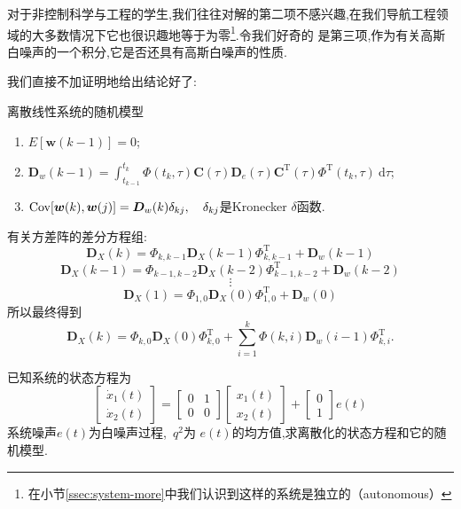 \documentclass[cn,10pt,citestyle=gb7714-2015,bibstyle=gb7714-2015]{elegantbook}
\newcommand{\md}{\ \mathrm{d}}
\newcommand{\mT}{\mathrm{T}}
\newcommand{\Cov}{\textup{Cov}}
\begin{document}
对于非控制科学与工程的学生,我们往往对解的第二项不感兴趣,在我们导航工程领域的大多数情况下它也很识趣地等于为零\footnote{在小节\ref{ssec:system-more}中我们认识到这样的系统是独立的（autonomous）}.令我们好奇的
是第三项,作为有关高斯白噪声的一个积分,它是否还具有高斯白噪声的性质.

我们直接不加证明地给出结论好了:
\begin{conclusion}离散线性系统的随机模型
  \begin{enumerate}
    \item $\displaystyle E[\bm{w}(k-1)]=0$;
    \item $\displaystyle \bm{D}_w(k-1)=\int_{t_{k-1}}^{t_k}\bm{\varPhi}(t_k,\tau)\bm{C}(\tau)\bm{D}_e(\tau)\bm{C}^\mT(\tau)\bm{\varPhi}^\mT(t_k,\tau)\md\tau$;
    \item $\Cov[\bm{w}(k),\bm{w}(j)]=\bm{D}_w(k)\delta_{kj},\quad\delta_{kj}$是\textup{Kronecker} $\delta$函数.
  \end{enumerate}
\end{conclusion}
\textcolor{magenta}{\HandRight}有关方差阵的差分方程组:
\begin{equation}
  \bm{D}_X(k)=\bm{\varPhi}_{k,k-1}\bm{D}_X(k-1)\bm{\varPhi}^\mT_{k,k-1}+\bm{D}_w(k-1)
\end{equation}
\[
  \bm{D}_X(k-1)=\bm{\varPhi}_{k-1,k-2}\bm{D}_X(k-2)\bm{\varPhi}^\mT_{k-1,k-2}+\bm{D}_w(k-2)
\]
\[
    \vdots
\]
\[
  \bm{D}_X(1)=\bm{\varPhi}_{1,0}\bm{D}_X(0)\bm{\varPhi}^\mT_{1,0}+\bm{D}_w(0)
\]
所以最终得到
\begin{equation}
  \bm{D}_X(k)=\bm{\varPhi}_{k,0}\bm{D}_X(0)\bm{\varPhi}^\mT_{k,0}+\sum_{i=1}^k\bm{\varPhi}(k,i)\bm{D}_w(i-1)\bm{\varPhi}_{k,i}^\mT.
\end{equation}
\begin{example}
  已知系统的状态方程为
  \begin{equation}
    \begin{bmatrix}
      \dot{x}_1(t)\\
      \dot{x}_2(t)
    \end{bmatrix}=\begin{bmatrix}
      0&1\\
      0&0
    \end{bmatrix}\begin{bmatrix}
      x_1(t)\\
      x_2(t)
    \end{bmatrix}+\begin{bmatrix}
      0\\
      1
    \end{bmatrix}e(t)
  \end{equation}
  系统噪声$e(t)$为白噪声过程,\ $q^2$为
  $e(t)$的均方值,求离散化的状态方程和它的随机模型.
\end{example}
\end{document}
